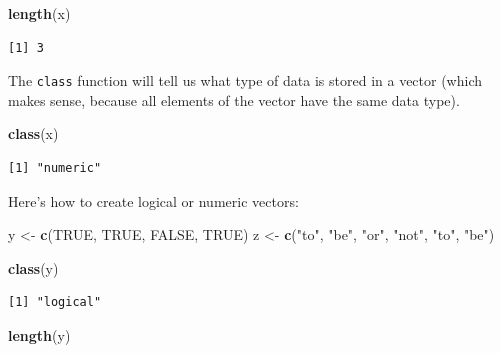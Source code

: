\documentclass[
]{book}
\newenvironment{Shaded}{\begin{snugshade}}{\end{snugshade}}
\newcommand{\KeywordTok}[1]{\textcolor[rgb]{0.13,0.29,0.53}{\textbf{#1}}}
\newcommand{\NormalTok}[1]{#1}
\newcommand{\OtherTok}[1]{\textcolor[rgb]{0.56,0.35,0.01}{#1}}
\newcommand{\StringTok}[1]{\textcolor[rgb]{0.31,0.60,0.02}{#1}}
\begin{document}
\begin{Shaded}
\begin{Highlighting}[]
\KeywordTok{length}\NormalTok{(x)}
\end{Highlighting}
\end{Shaded}

\begin{verbatim}
[1] 3
\end{verbatim}

The \texttt{class} function will tell us what type of data is stored in a vector (which makes sense, because all elements of the vector have the same data type).

\begin{Shaded}
\begin{Highlighting}[]
\KeywordTok{class}\NormalTok{(x)}
\end{Highlighting}
\end{Shaded}

\begin{verbatim}
[1] "numeric"
\end{verbatim}

Here's how to create logical or numeric vectors:

\begin{Shaded}
\begin{Highlighting}[]
\NormalTok{y <-}\StringTok{ }\KeywordTok{c}\NormalTok{(}\OtherTok{TRUE}\NormalTok{, }\OtherTok{TRUE}\NormalTok{, }\OtherTok{FALSE}\NormalTok{, }\OtherTok{TRUE}\NormalTok{)}
\NormalTok{z <-}\StringTok{ }\KeywordTok{c}\NormalTok{(}\StringTok{"to"}\NormalTok{, }\StringTok{"be"}\NormalTok{, }\StringTok{"or"}\NormalTok{, }\StringTok{"not"}\NormalTok{, }\StringTok{"to"}\NormalTok{, }\StringTok{"be"}\NormalTok{) }
\end{Highlighting}
\end{Shaded}

\begin{Shaded}
\begin{Highlighting}[]
\KeywordTok{class}\NormalTok{(y)}
\end{Highlighting}
\end{Shaded}

\begin{verbatim}
[1] "logical"
\end{verbatim}

\begin{Shaded}
\begin{Highlighting}[]
\KeywordTok{length}\NormalTok{(y)}
\end{Highlighting}
\end{Shaded}
\end{document}
